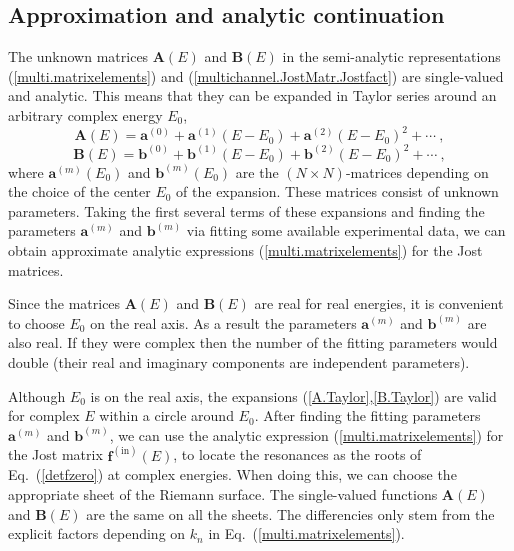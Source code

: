 \documentclass[12pt]{article}
\begin{document}
\subsection{Approximation and analytic continuation}
\label{sect.ApprCont}
The unknown matrices $\bm{A}(E)$ and $\bm{B}(E)$ in the semi-analytic
representations (\ref{multi.matrixelements}) and
(\ref{multichannel.JostMatr.Jostfact}) are single-valued and analytic. This
means that they can be expanded in Taylor series around an arbitrary complex
energy $E_0$,
\begin{equation}
\label{A.Taylor}
   \bm{A}(E)=\bm{a}^{(0)}+\bm{a}^{(1)}(E-E_0)+
   \bm{a}^{(2)}(E-E_0)^2+\cdots\ ,
\end{equation}
\begin{equation}
\label{B.Taylor}
   \bm{B}(E)=\bm{b}^{(0)}+\bm{b}^{(1)}(E-E_0)+
   \bm{b}^{(2)}(E-E_0)^2+\cdots\ ,
\end{equation}
where $\bm{a}^{(m)}(E_0)$ and $\bm{b}^{(m)}(E_0)$ are the $(N\times
N)$-matrices depending on the choice of the center $E_0$ of the expansion. These
matrices consist of unknown parameters. Taking the first several terms of these
expansions and finding the parameters $\bm{a}^{(m)}$ and $\bm{b}^{(m)}$ via
fitting some available experimental data, we can obtain approximate analytic
expressions (\ref{multi.matrixelements}) for the Jost matrices.

Since the matrices $\bm{A}(E)$ and $\bm{B}(E)$ are real for real energies, it is
convenient to choose $E_0$ on the real axis. As a result the parameters
$\bm{a}^{(m)}$ and $\bm{b}^{(m)}$ are also real. If they were complex then the
number of the fitting parameters would double (their real and imaginary
components are independent parameters).

Although $E_0$ is on the real axis, the expansions
(\ref{A.Taylor},\ref{B.Taylor}) are valid for complex $E$ within a circle around
$E_0$. After finding the fitting  parameters $\bm{a}^{(m)}$ and $\bm{b}^{(m)}$,
we can use the analytic expression (\ref{multi.matrixelements}) for the Jost
matrix $\bm{f}^{\mathrm{(in)}}(E)$, to locate the resonances as the roots of
Eq.~(\ref{detfzero}) at complex energies. When doing this, we can choose the
appropriate sheet of the Riemann surface. The single-valued functions
$\bm{A}(E)$ and $\bm{B}(E)$ are the same on all the sheets. The differencies
only stem from the explicit factors depending on $k_n$ in
Eq.~(\ref{multi.matrixelements}).
\end{document}
